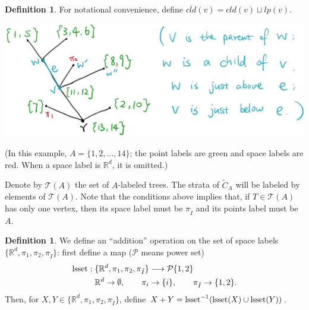 \documentclass[11pt]{article}
\theoremstyle{definition}
\newtheorem{dfn}[thm]{Definition}
\theoremstyle{remark}
\def\wt#1{\widetilde{#1}}
\def\ov#1{\overline{#1}}
\def\R{\mathbb{R}}
\def\cT{\mathcal{T}}
\def\rI{{\mathring{I}}}
\def\tn#1{\textnormal{#1}}
\begin{document}
\begin{dfn}
For notational convenience, define $\ov{cld}(v)=cld(v)\sqcup lp(v)$. 
\end{dfn}

\begin{minipage}{.6\textwidth}
\includegraphics[scale=0.2]{tree_fig}
\end{minipage}
\begin{minipage}{.4\textwidth}
(In this example, $A=\{1,2,\ldots,14\}$; the point labels are green and space labels are red. When a space label is $\R^d$, it is omitted.)
\end{minipage}


Denote by $\cT(A)$ the set of $A$-labeled trees. 
The strata of $\wt{C}_A$ will be labeled by elements of $\cT(A)$. 
Note that the conditions above implies that, if $T\in\cT(A)$ has only one vertex, then its space label must be $\pi_\rI$ and its points label must be $A$. 

\begin{dfn}
We define an ``addition'' operation on the set of space labels $\{\R^d,\pi_1,\pi_2,\pi_\rI\}$: 
first define a map ($\mathcal{P}$ means power set)
\begin{align}
\tn{lsset}:\{\R^d,\pi_1,\pi_2,\pi_\rI\}&\longrightarrow \mathcal{P}\{1,2\}\\
\R^d\to\emptyset,\qquad \pi_i&\to \{i\},\qquad \pi_\rI\to\{1,2\}\nonumber.
\end{align}
Then, for $X,Y\in \{\R^d,\pi_1,\pi_2,\pi_\rI\}$, define $X+Y=\tn{lsset}^{-1}(\tn{lsset}(X)\cup\tn{lsset}(Y))$. 
\end{dfn}
\end{document}
